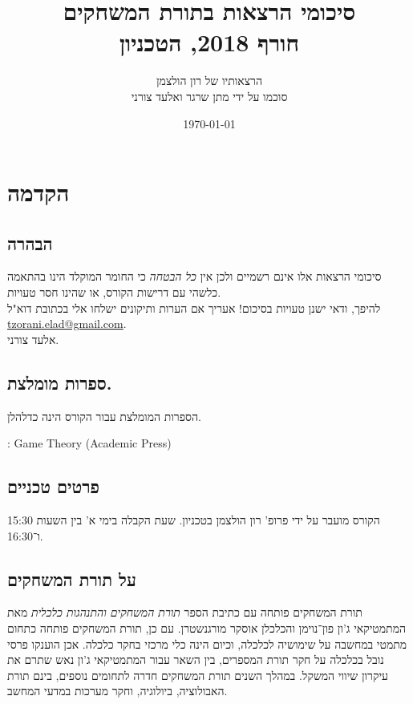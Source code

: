 \documentclass[a4paper,10pt,twoside,openany]{book}
\title{סיכומי הרצאות בתורת המשחקים \\ \large{חורף 2018, הטכניון}}
\author{הרצאותיו של רון הולצמן \\ \large סוכמו על ידי מתן שרגר ואלעד צורני}
\date{\today}
\begin{document}
\frontmatter
{}
\tableofcontents
\countlectures
\newpage

\chapter*{הקדמה}
 

\section*{הבהרה}

סיכומי הרצאות אלו אינם רשמיים ולכן אין
\emph{כל הבטחה}
כי החומר המוקלד הינו בהתאמה כלשהי עם דרישות הקורס, או שהינו חסר טעויות.
\\
להיפך, ודאי ישנן טעויות בסיכום! אעריך אם הערות ותיקונים ישלחו אלי בכתובת דוא"ל
\textenglish{\href{mailto:tzorani.elad@gmail.com}{tzorani.elad@gmail.com}}.\\
אלעד צורני.

\section*{ספרות מומלצת.}

הספרות המומלצת עבור הקורס הינה כדלהלן.

\begin{english}
\begin{description}
\item {}: Game Theory (Academic Press)
\end{description}
\end{english}

\section*{פרטים טכניים}
הקורס מועבר על ידי פרופ' רון הולצמן בטכניון.
שעת הקבלה בימי א' בין השעות 15:30 ו־16:30.

\section*{על תורת המשחקים}

תורת המשחקים פותחה עם כתיבת הספר
\emph{תורת המשחקים והתנהגות כלכלית}
מאת המתמטיקאי ג'ון פון־נוימן והכלכלן אוסקר מורגנשטרן.
עם כן, תורת המשחקים פותחה כתחום מתמטי במחשבה על שימושיה לכלכלה, וכיום הינה כלי מרכזי בחקר כלכלה.
אכן הוענקו פרסי נובל בכלכלה על חקר תורת המספרים, בין השאר עבור המתמטיקאי ג'ון נאש שתרם את עיקרון שיווי המשקל.
במהלך השנים תורת המשחקים חדרה לתחומים נוספים, בינם תורת האבולוציה, ביולוגיה, וחקר מערכות במדעי המחשב.
\end{document}
